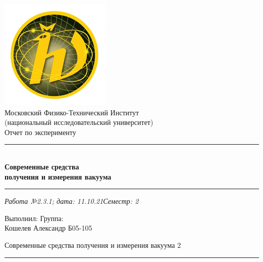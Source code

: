 \documentclass[12pt,a4paper]{scrartcl}
\begin{document}
	\begin{titlepage}
		
		\vspace*{\fill}
		
		\begin{center}
			\includegraphics[scale=0.8]{MIPT.png}
			\\[0.7cm]\Huge Московский Физико-Технический Институт\\(национальный исследовательский университет)
			\\[2cm]\LARGE Отчет по эксперименту
			\\[0.5cm]\noindent\rule{\textwidth}{1pt}
			\\\Huge\textbf{Современные средства\\получения и измерения вакуума}
			\\[-0.5cm]\noindent\rule{\textwidth}{1pt}
		\end{center}
		
		\begin{flushleft}
			\textit{Работа №2.3.1; дата: 11.10.21}\hfill\textit{Семестр: 2}
		\end{flushleft}
		
		\vspace*{\fill}
		
		\begin{flushleft}
			Выполнил: \hspace{\fill} Группа:
			\\Кошелев Александр \hspace{\fill} Б05-105
		\end{flushleft}
	\end{titlepage}
	
	
	\begin{flushleft}
		\footnotesize{Современные средства получения и измерения вакуума} \hspace{\fill} \footnotesize{2}
		\\[-0.3cm]\noindent\rule{\textwidth}{0.3pt}
	\end{flushleft}
	
\end{document}
